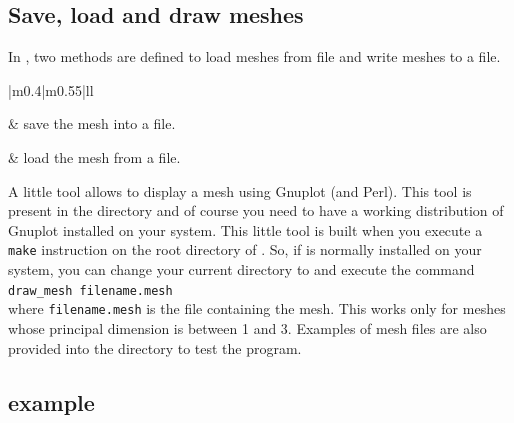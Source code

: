 \documentclass[11pt,a4paper]{article}
\begin{document}
\subsection{Save, load and draw meshes}

In , two methods are defined to load meshes from file and write meshes to a file. \\[0.5cm]
\begin{ctableau}{|m{0.4\linewidth}|m{0.55\linewidth}|}{ll}\hline

   & save the mesh into a file.\\ \hline

   & load the mesh from a file.\\ \hline

\end{ctableau}

A little tool allows to display a mesh using Gnuplot (and Perl). This tool is present in the directory  and of course you need to have a working distribution of Gnuplot installed on your system. This little tool is built when you execute a {\tt make} instruction on the root directory of \gf . So, if \gf  is normally installed on your system, you can change your current directory to  and execute the command \\[0.5cm]
{\tt draw\_mesh filename.mesh} \\[0.5cm]
where {\tt filename.mesh} is the file containing the mesh. This works only for meshes whose principal dimension is between 1 and 3. Examples of mesh files are also provided into the directory  to test the program.

\subsection{example}
\end{document}
